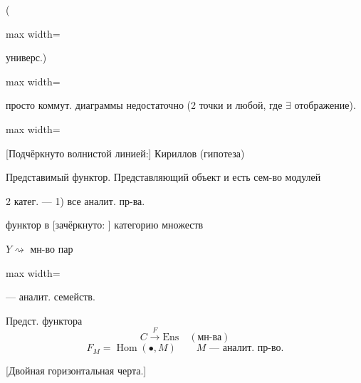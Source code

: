 \documentclass[11pt]{article}
\theoremstyle{definition}
\theoremstyle{remark}
\newcommand{\Unclear}[3]{%
  \begingroup\color{orange!70!black}%
  [Unresolved reading #1/#2: #3]\endgroup%
}
\renewcommand{\Unclear}[3]{%
  \begingroup\color{orange!65!black}%
  \ifmmode\text{[неясно: #3]}\else[неясно: #3]\fi\endgroup%
}
\let\DiplomaticMathUnderline\underline
\renewcommand{\underline}[1]{\ifmmode\DiplomaticMathUnderline{#1}\else\uline{#1}\fi}
\begin{document}
(
\begin{adjustbox}{max width=\linewidth}
\end{adjustbox}
универс.)

\begin{adjustbox}{max width=\linewidth}
\end{adjustbox}

просто коммут. диаграммы недостаточно
(2 точки и любой, где $\exists$ отображение).

\begin{adjustbox}{max width=\linewidth}
\end{adjustbox}

[Подчёркнуто волнистой линией:] Кириллов (гипотеза)

Представимый функтор. Представляющий объект и есть сем-во модулей

2 катег. — 1) все аналит. пр-ва.

функтор в [зачёркнуто: \Unclear{GELFAND-P000239}{category-cancelled}{2)}] категорию множеств

$Y\rightsquigarrow$ мн-во пар
\begin{adjustbox}{max width=\linewidth}
\end{adjustbox}
— аналит. семейств.

Предст. функтора
\begin{equation*}
C\overset{F}{\longrightarrow}\mathrm{Ens}\quad (\text{мн-ва})
\end{equation*}
\begin{equation*}
F_M=\operatorname{Hom}(\bullet,M)\qquad M\text{ — аналит. пр-во.}
\end{equation*}

[Двойная горизонтальная черта.]
\end{document}
